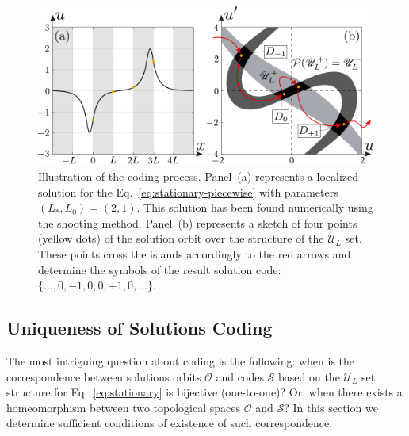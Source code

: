 \begin{figure}[h]
\centering
	\includegraphics[scale = 1]{pic/solution and orbit on the phase plane}
	\caption{
		Illustration of the coding process.
		Panel~(a) represents a localized solution for the Eq.~\eqref{eq:stationary-piecewise} with parameters $(L_*, L_0) = (2, 1)$.
		This solution has been found numerically using the shooting method.
		Panel~(b) represents a sketch of four points (yellow dots) of the solution orbit over the structure of the $\mathscr{U}_L$ set.
		These points cross the islands accordingly to the red arrows and determine the symbols of the result solution code: $\{ \dots, 0, -1, 0, 0, +1, 0, \dots \}$.
	}
\label{fig:solution-and-orbit}
\end{figure}

\subsection{Uniqueness of Solutions Coding}

The most intriguing question about coding is the following: when is the correspondence between solutions orbits $\mathcal{O}$ and codes $\mathcal{S}$ based on the $\mathscr{U}_L$ set structure for Eq.~\eqref{eq:stationary} is bijective (one-to-one)?
Or, when there exists a homeomorphism between two topological spaces $\mathcal{O}$ and $\mathcal{S}$?
In this section we determine sufficient conditions of existence of such correspondence.

